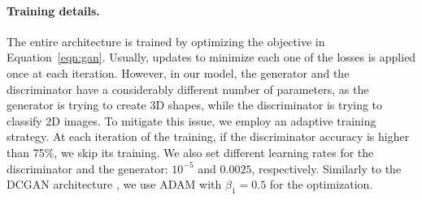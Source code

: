\paragraph{Training details.}
The entire architecture is trained by optimizing the objective in Equation~\ref{eqn:gan}.
Usually, updates to minimize each one of the losses is applied once at each
iteration.
However, in our model, the generator and the discriminator have a considerably different
number of parameters, as the generator is trying to create 3D shapes,
while the discriminator is trying to classify 2D images.
To mitigate this issue, we employ an adaptive training strategy.
At each iteration of the training, if the discriminator accuracy is higher than 75\%,
we skip its training.
We also set different learning rates for the discriminator and the generator:
$10^{-5}$ and $0.0025$, respectively.
Similarly to the DCGAN architecture \cite{radford2015unsupervised}, we
use ADAM with $\beta_1=0.5$ for the optimization.


